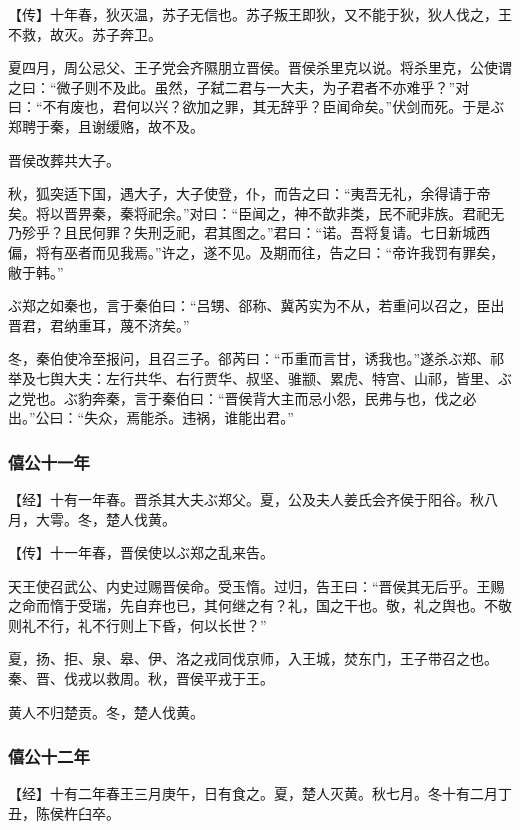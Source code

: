 \documentclass[]{article}
\begin{document}
【传】十年春，狄灭温，苏子无信也。苏子叛王即狄，又不能于狄，狄人伐之，王不救，故灭。苏子奔卫。

夏四月，周公忌父、王子党会齐隰朋立晋侯。晋侯杀里克以说。将杀里克，公使谓之曰：``微子则不及此。虽然，子弑二君与一大夫，为子君者不亦难乎？''对曰：``不有废也，君何以兴？欲加之罪，其无辞乎？臣闻命矣。''伏剑而死。于是ぶ郑聘于秦，且谢缓赂，故不及。

晋侯改葬共大子。

秋，狐突适下国，遇大子，大子使登，仆，而告之曰：``夷吾无礼，余得请于帝矣。将以晋畀秦，秦将祀余。''对曰：``臣闻之，神不歆非类，民不祀非族。君祀无乃殄乎？且民何罪？失刑乏祀，君其图之。''君曰：``诺。吾将复请。七日新城西偏，将有巫者而见我焉。''许之，遂不见。及期而往，告之曰：``帝许我罚有罪矣，敝于韩。''

ぶ郑之如秦也，言于秦伯曰：``吕甥、郤称、冀芮实为不从，若重问以召之，臣出晋君，君纳重耳，蔑不济矣。''

冬，秦伯使冷至报问，且召三子。郤芮曰：``币重而言甘，诱我也。''遂杀ぶ郑、祁举及七舆大夫：左行共华、右行贾华、叔坚、骓颛、累虎、特宫、山祁，皆里、ぶ之党也。ぶ豹奔秦，言于秦伯曰：``晋侯背大主而忌小怨，民弗与也，伐之必出。''公曰：``失众，焉能杀。违祸，谁能出君。''

\hypertarget{header-n763}{%
\subsubsection{僖公十一年}\label{header-n763}}

【经】十有一年春。晋杀其大夫ぶ郑父。夏，公及夫人姜氏会齐侯于阳谷。秋八月，大雩。冬，楚人伐黄。

【传】十一年春，晋侯使以ぶ郑之乱来告。

天王使召武公、内史过赐晋侯命。受玉惰。过归，告王曰：``晋侯其无后乎。王赐之命而惰于受瑞，先自弃也已，其何继之有？礼，国之干也。敬，礼之舆也。不敬则礼不行，礼不行则上下昏，何以长世？''

夏，扬、拒、泉、皋、伊、洛之戎同伐京师，入王城，焚东门，王子带召之也。秦、晋、伐戎以救周。秋，晋侯平戎于王。

黄人不归楚贡。冬，楚人伐黄。

\hypertarget{header-n771}{%
\subsubsection{僖公十二年}\label{header-n771}}

【经】十有二年春王三月庚午，日有食之。夏，楚人灭黄。秋七月。冬十有二月丁丑，陈侯杵臼卒。
\end{document}
